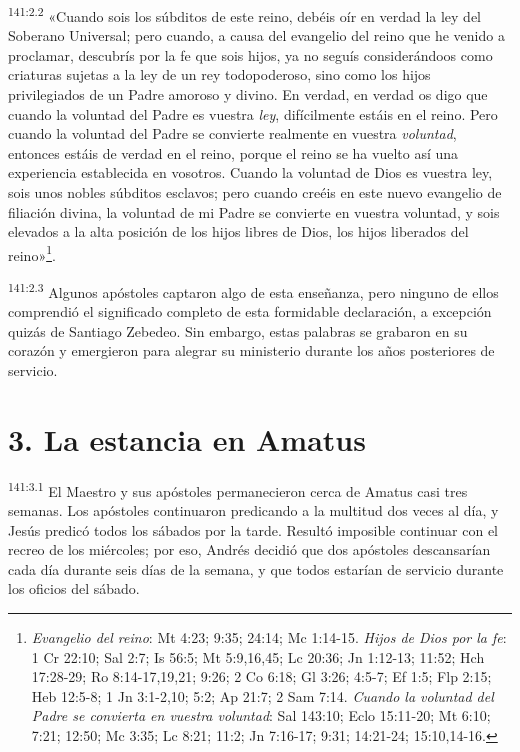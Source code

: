 \par 
\textsuperscript{141:2.2} «Cuando sois los súbditos de este reino, debéis oír en verdad la ley del Soberano Universal; pero cuando, a causa del evangelio del reino que he venido a proclamar, descubrís por la fe que sois hijos, ya no seguís considerándoos como criaturas sujetas a la ley de un rey todopoderoso, sino como los hijos privilegiados de un Padre amoroso y divino. En verdad, en verdad os digo que cuando la voluntad del Padre es vuestra \textit{ley}, difícilmente estáis en el reino. Pero cuando la voluntad del Padre se convierte realmente en vuestra \textit{voluntad}, entonces estáis de verdad en el reino, porque el reino se ha vuelto así una experiencia establecida en vosotros. Cuando la voluntad de Dios es vuestra ley, sois unos nobles súbditos esclavos; pero cuando creéis en este nuevo evangelio de filiación divina, la voluntad de mi Padre se convierte en vuestra voluntad, y sois elevados a la alta posición de los hijos libres de Dios, los hijos liberados del reino»\footnote{\textit{Evangelio del reino}: Mt 4:23; 9:35; 24:14; Mc 1:14-15. \textit{Hijos de Dios por la fe}: 1 Cr 22:10; Sal 2:7; Is 56:5; Mt 5:9,16,45; Lc 20:36; Jn 1:12-13; 11:52; Hch 17:28-29; Ro 8:14-17,19,21; 9:26; 2 Co 6:18; Gl 3:26; 4:5-7; Ef 1:5; Flp 2:15; Heb 12:5-8; 1 Jn 3:1-2,10; 5:2; Ap 21:7; 2 Sam 7:14. \textit{Cuando la voluntad del Padre se convierta en vuestra voluntad}: Sal 143:10; Eclo 15:11-20; Mt 6:10; 7:21; 12:50; Mc 3:35; Lc 8:21; 11:2; Jn 7:16-17; 9:31; 14:21-24; 15:10,14-16.}.

\par 
\textsuperscript{141:2.3} Algunos apóstoles captaron algo de esta enseñanza, pero ninguno de ellos comprendió el significado completo de esta formidable declaración, a excepción quizás de Santiago Zebedeo. Sin embargo, estas palabras se grabaron en su corazón y emergieron para alegrar su ministerio durante los años posteriores de servicio.

\section*{3. La estancia en Amatus}
\par 
\textsuperscript{141:3.1} El Maestro y sus apóstoles permanecieron cerca de Amatus casi tres semanas. Los apóstoles continuaron predicando a la multitud dos veces al día, y Jesús predicó todos los sábados por la tarde. Resultó imposible continuar con el recreo de los miércoles; por eso, Andrés decidió que dos apóstoles descansarían cada día durante seis días de la semana, y que todos estarían de servicio durante los oficios del sábado.

